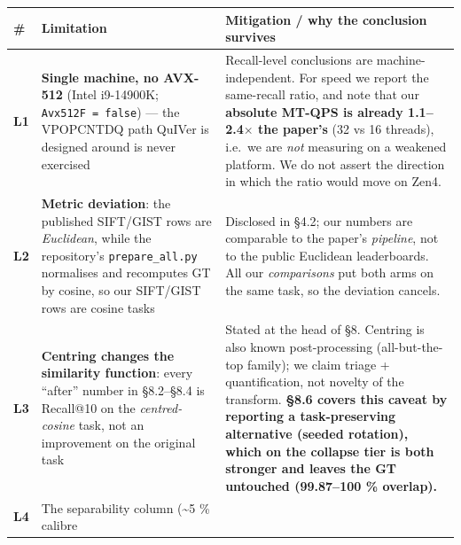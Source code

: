 \documentclass[
  10pt,
]{article}
\newcounter{none} %
\begin{document}
{\def\LTcaptype{none} %
\begin{longtable}[]{@{}
  >{\raggedright\arraybackslash}p{}
  >{\raggedright\arraybackslash}p{}
  >{\raggedright\arraybackslash}p{}@{}}
\toprule\noalign{}
\begin{minipage}[b]{\linewidth}\raggedright
\#
\end{minipage} & \begin{minipage}[b]{\linewidth}\raggedright
Limitation
\end{minipage} & \begin{minipage}[b]{\linewidth}\raggedright
Mitigation / why the conclusion survives
\end{minipage} \\
\midrule\noalign{}
\endhead
\bottomrule\noalign{}
\endlastfoot
\textbf{L1} & \textbf{Single machine, no AVX-512} (Intel i9-14900K;
\texttt{Avx512F\ =\ false}) --- the VPOPCNTDQ path QuIVer is designed
around is never exercised & Recall-level conclusions are
machine-independent. For speed we report the same-recall ratio, and note
that our \textbf{absolute MT-QPS is already 1.1--2.4$\times$ the paper's} (32
vs 16 threads), i.e.~we are \emph{not} measuring on a weakened platform.
We do not assert the direction in which the ratio would move on Zen4. \\
\textbf{L2} & \textbf{Metric deviation}: the published SIFT/GIST rows
are \emph{Euclidean}, while the repository's \texttt{prepare\_all.py}
normalises and recomputes GT by cosine, so our SIFT/GIST rows are cosine
tasks & Disclosed in §4.2; our numbers are comparable to the paper's
\emph{pipeline}, not to the public Euclidean leaderboards. All our
\emph{comparisons} put both arms on the same task, so the deviation
cancels. \\
\textbf{L3} & \textbf{Centring changes the similarity function}: every
``after'' number in §8.2--§8.4 is Recall@10 on the \emph{centred-cosine}
task, not an improvement on the original task & Stated at the head of
§8. Centring is also known post-processing (all-but-the-top family); we
claim triage + quantification, not novelty of the transform.
\textbf{§8.6 covers this caveat by reporting a task-preserving
alternative (seeded rotation), which on the collapse tier is both
stronger and leaves the GT untouched (99.87--100 \% overlap).} \\
\textbf{L4} & The separability column (\textasciitilde5 \% calibre

\end{longtable}}
\end{document}
